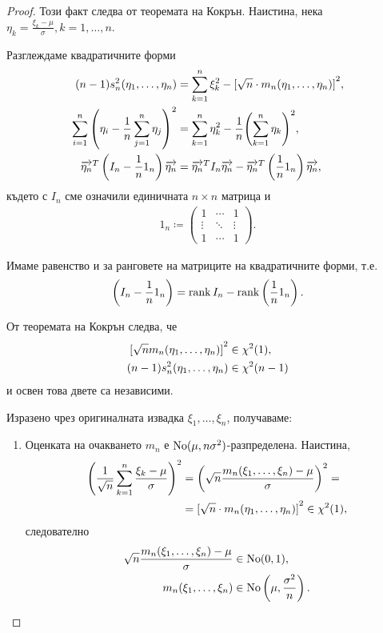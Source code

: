 \documentclass[numbers=endperiod, bibliography=totocnumbered]{scrartcl}
\begin{document}
\begin{proof}
  Този факт следва от теоремата на Кокрън. Наистина, нека \( \eta_k = \frac {\xi_k - \mu} \sigma, k = 1, \ldots, n \).

  Разглеждаме квадратичните форми
  \begin{align*}
    (n-1) s_n^2(\eta_1, \ldots, \eta_n)
    &=
    \sum_{k=1}^n \xi_k^2 - {[\sqrt n \cdot m_n(\eta_1, \ldots, \eta_n)]}^2,
    \\
    \sum_{i=1}^n {\left(\eta_i - \frac 1 n \sum_{j=1}^n \eta_j \right)}^2
    &=
    \sum_{k=1}^n \eta_k^2 - \frac 1 n {\left(\sum_{k=1}^n \eta_k \right)}^2,
    \\
    \overrightarrow{\eta_n}^T \left(I_n - \frac 1 n 1_n \right) \overrightarrow{\eta_n}
    &=
    \overrightarrow{\eta_n}^T I_n \overrightarrow{\eta_n} - \overrightarrow{\eta_n}^T \left(\frac 1 n 1_n \right) \overrightarrow{\eta_n},
  \end{align*}
  където с \( I_n \) сме означили единичната \( n \times n \) матрица и
  \begin{align*}
    1_n
    \coloneqq
    \begin{pmatrix}
      1 & \cdots & 1 \\
      \vdots & \ddots & \vdots \\
      1 & \cdots & 1
    \end{pmatrix}.
  \end{align*}

  Имаме равенство и за ранговете на матриците на квадратичните форми, т.е.
  \begin{align*}
    \left(I_n - \frac 1 n 1_n \right) = \operatorname{rank} I_n - \operatorname{rank} \left( \frac 1 n 1_n \right).
  \end{align*}

  От теоремата на Кокрън следва, че
  \begin{align*}
    {[\sqrt n m_n(\eta_1, \ldots, \eta_n)]}^2 &\in \operatorname{\chi^2}(1),
    \\
    (n-1) s_n^2(\eta_1, \ldots, \eta_n) &\in \operatorname{\chi^2}(n - 1)
  \end{align*}
  и освен това двете са независими.

  Изразено чрез оригиналната извадка \( \xi_1, \ldots, \xi_n \), получаваме:
  \begin{enumerate}
    \item Оценката на очакването \( m_n \) е \( \operatorname{No}(\mu, n \sigma^2) \)-разпределена. Наистина,
    \begin{align*}
      {\left(\frac 1 {\sqrt n} \sum_{k=1}^n \frac {\xi_k - \mu} \sigma \right)}^2
      &=
      {\left( \sqrt n \frac {m_n(\xi_1, \ldots, \xi_n) - \mu} \sigma \right)}^2
      = \\ &=
      {[\sqrt n \cdot m_n(\eta_1, \ldots, \eta_n)]}^2
      \in
      \operatorname{\chi^2}(1),
    \end{align*}
    следователно
    \begin{align*}
      \sqrt n \frac {m_n(\xi_1, \ldots, \xi_n) - \mu} \sigma &\in \operatorname{No}(0, 1),
      \\
      m_n(\xi_1, \ldots, \xi_n) &\in \operatorname{No} \left(\mu, \frac {\sigma^2} n \right).
    \end{align*}


\end{enumerate}
\end{proof}
\end{document}

